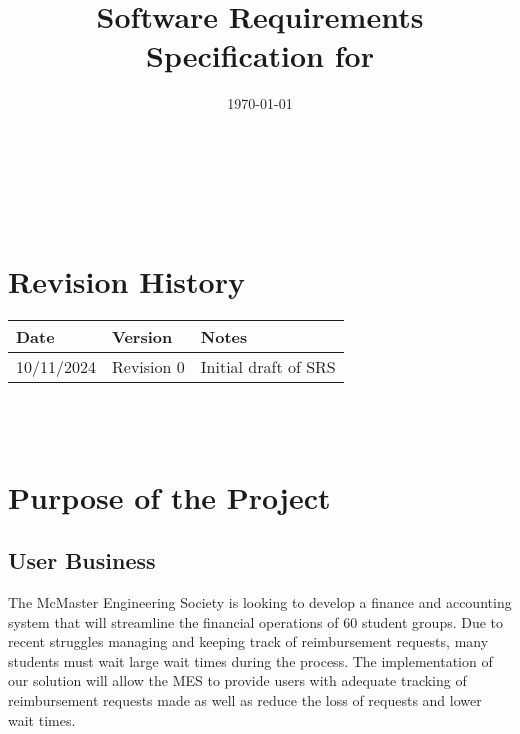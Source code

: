 \documentclass[12pt]{article}
\begin{document}
\title{Software Requirements Specification for \progname} 
\author{\authname}
\date{\today}
	
\maketitle

~\newpage


\tableofcontents

~\newpage

\section*{Revision History}

\begin{tabularx}{\textwidth}{p{3cm}p{2cm}X}
\toprule {\textbf{Date}} & {\textbf{Version}} & {\textbf{Notes}}\\
\midrule
10/11/2024 & Revision 0 & Initial draft of SRS\\
\bottomrule
\end{tabularx}

~\\

~\newpage
\section{Purpose of the Project}
\subsection{User Business}
The McMaster Engineering Society is looking to develop a finance and accounting system that will streamline the financial operations of 60 student groups. Due to recent struggles managing and keeping track of reimbursement requests, many students must wait large wait times during the process. The implementation of our solution will allow the MES to provide users with adequate tracking of reimbursement requests made as well as reduce the loss of requests and lower wait times.
\end{document}

